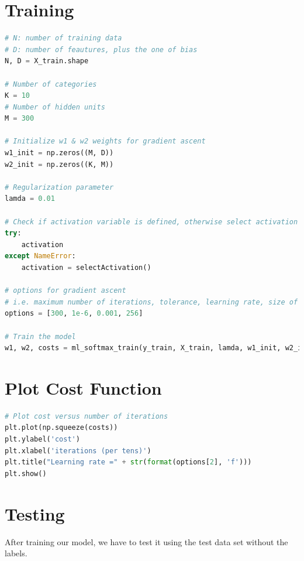 \documentclass[11pt]{article}
\begin{document}
\newpage

\section{Training}

\begin{lstlisting}[language = Python]
# N: number of training data
# D: number of feautures, plus the one of bias
N, D = X_train.shape

# Number of categories
K = 10
# Number of hidden units
M = 300 

# Initialize w1 & w2 weights for gradient ascent
w1_init = np.zeros((M, D))
w2_init = np.zeros((K, M))

# Regularization parameter
lamda = 0.01

# Check if activation variable is defined, otherwise select activation function
try:
    activation
except NameError:
    activation = selectActivation()

# options for gradient ascent
# i.e. maximum number of iterations, tolerance, learning rate, size of batches
options = [300, 1e-6, 0.001, 256]

# Train the model
w1, w2, costs = ml_softmax_train(y_train, X_train, lamda, w1_init, w2_init, options, activation)
\end{lstlisting}

\newpage

\section{Plot Cost Function}

\begin{lstlisting}[language = Python]
# Plot cost versus number of iterations
plt.plot(np.squeeze(costs))
plt.ylabel('cost')
plt.xlabel('iterations (per tens)')
plt.title("Learning rate =" + str(format(options[2], 'f')))
plt.show()
\end{lstlisting}

\hfill

\section{Testing}
After training our model, we have to test it using the test data set without the labels. \\
\end{document}
